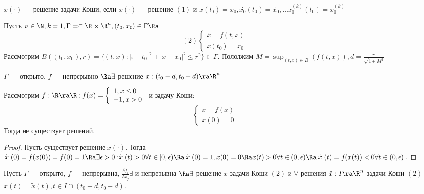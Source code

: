\begin{note}
    \(x(\cdot)\) --- решение задачи Коши, если \(x(\cdot)\) --- решение \((1)\) и \(x(t_0) = x_0,  \stackrel{.}{x_0}(t_0) = \stackrel{.}{x_0}, \dots x_0^{(k)}(t_0) = x_0^{(k)}\)
\end{note}

\begin{theorem}
    Пусть \(n \in \N, k = 1, \Gamma = \subset \R \times \R^n, (t_0, x_0) \in \Gamma \Ra \)
    \[(2)\left\{\begin{array}{l}
        \stackrel{.}{x} = f(t, x) \\
        x(t_0) = x_0
    \end{array}\right.\]
    Рассмотрим \(B((t_0, x_0), r) = \{(t, x) : |t - t_0|^2 + |x - x_0|^2 \le r^2\} \subset \Gamma\). Пололжим \(M = \sup_{(t, x) \in B}(f(t, x)), d = \frac{r}{\sqrt{1 + M^2}}\)

    \(\Gamma\) --- открыто, \(f\) --- непрерывно \(\Ra \exists \) решение \(x: (t_0 - d, t_0 + d) \ra \R^n\)
\end{theorem}

\begin{example}
    Рассмотрим \(f: \R \ra \R: f(x) = \left\{\begin{array}{l}
        1, x \le 0 \\
        -1, x > 0
    \end{array}\right.\) и задачу Коши:
    \[\left\{\begin{array}{l}
        \stackrel{.}{x} = f(x) \\
        x(0) = 0
    \end{array}\right.\]
    Тогда не существует решений.
\end{example}
\begin{proof}
    Пусть существует решение \(x(\cdot)\). Тогда \(\stackrel{.}{x}(0) = f(x(0)) = f(0) = 1 \Ra \exists \epsilon > 0: \stackrel{.}{x}(t) > 0 \forall t \in [0, \epsilon) \Ra \stackrel{.}{x}(0) = 1, x(0) = 0 \Ra x(t) > 0 \forall t \in (0, \epsilon) \Ra \stackrel{.}{x}(t) = f(x(t)) < 0 \forall t \in (0, \epsilon)\).
\end{proof}

\begin{theorem}
    Пусть \(\Gamma\) --- открыто, \(f\) --- непрерывна, \(\frac{\delta f_i}{\delta x_j} \exists\) и непрерывна \(\Ra \exists \) решение \(x\) задачи Коши \((2)\) и \(\forall\) решения \(\tilde{x}: I \ra \R^n\) задачи Коши \((2)\) \(x(t) = \tilde{x}(t), t \in I \cap (t_0 - d, t_0 + d)\).
\end{theorem}

